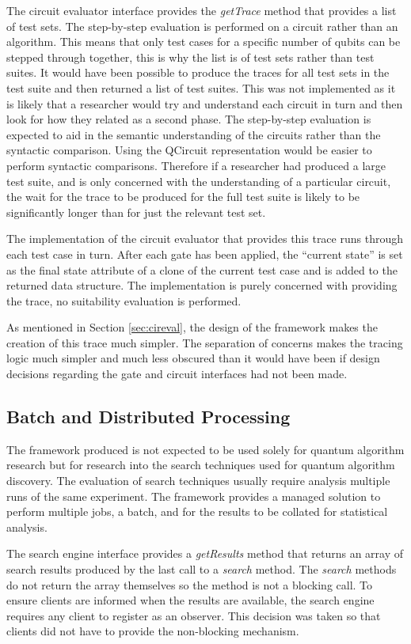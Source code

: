 The circuit evaluator interface provides the \emph{getTrace} method that provides a list of test sets.
The step-by-step evaluation is performed on a circuit rather than an algorithm.
This means that only test cases for a specific number of qubits can be stepped through together, this is why the list is of test sets rather than test suites.
It would have been possible to produce the traces for all test sets in the test suite and then returned a list of test suites.
This was not implemented as it is likely that a researcher would try and understand each circuit in turn and then look for how they related as a second phase.
The step-by-step evaluation is expected to aid in the semantic understanding of the circuits rather than the syntactic comparison.
Using the QCircuit representation would be easier to perform syntactic comparisons.
Therefore if a researcher had produced a large test suite, and is only concerned with the understanding of a particular circuit, the wait for the trace to be produced for the full test suite is likely to be significantly longer than for just the relevant test set.

The implementation of the circuit evaluator that provides this trace runs through each test case in turn.
After each gate has been applied, the ``current state'' is set as the final state attribute of a clone of the current test case and is added to the returned data structure.
The implementation is purely concerned with providing the trace, no suitability evaluation is performed.

As mentioned in Section \ref{sec:cireval}, the design of the framework makes the creation of this trace much simpler.
The separation of concerns makes the tracing logic much simpler and much less obscured than it would have been if design decisions regarding the gate and circuit interfaces had not been made.

\subsection{Batch and Distributed Processing}
The framework produced is not expected to be used solely for quantum algorithm research but for research into the search techniques used for quantum algorithm discovery.
The evaluation of search techniques usually require analysis multiple runs of the same experiment.
The framework provides a managed solution to perform multiple jobs, a batch, and for the results to be collated for statistical analysis.

The search engine interface provides a \emph{getResults} method that returns an array of search results produced by the last call to a \emph{search} method.
The \emph{search} methods do not return the array themselves so the method is not a blocking call.
To ensure clients are informed when the results are available, the search engine requires any client to register as an observer.
This decision was taken so that clients did not have to provide the non-blocking mechanism.

